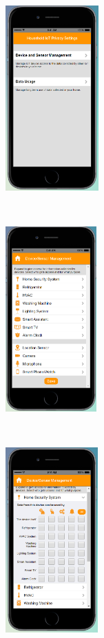 \begin{figure}
	\centering
	\begin{subfigure}[t]{0.24\textwidth}
		\centering
		\includegraphics[height=2.8in]{figures/ui1allOff.png}
	\end{subfigure}%
	~
	\begin{subfigure}[t]{0.24\textwidth}
		\centering
		\includegraphics[height=2.8in]{figures/ui1allOff2.png}
	\end{subfigure}%
	~
	\begin{subfigure}[t]{0.24\textwidth}
		\centering
		\includegraphics[height=2.8in]{figures/ui1allOff3.png}

\end{subfigure}
\end{figure}
